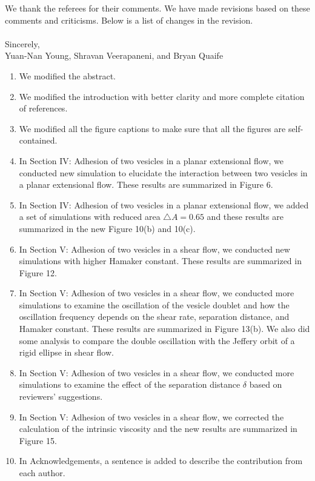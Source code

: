 \documentclass[11pt]{article}
\begin{document}
\noindent
We thank the referees for their comments.   We have made revisions based on these comments and criticisms.
Below is a list of changes in the revision.
\\ \\ \noindent 
Sincerely, \\ \noindent
Yuan-Nan Young, Shravan Veerapaneni, and Bryan Quaife

\vspace{20pt}

\begin{enumerate}

\item We modified the abstract.

\item We modified the introduction with better clarity and more complete citation of references.

\item We modified all the figure captions to make sure that all the figures are self-contained.

\item In Section IV: Adhesion of two vesicles in a planar extensional flow, we conducted new simulation to elucidate the interaction between two vesicles in a planar extensional flow. These results are summarized in Figure 6.

\item In Section IV: Adhesion of two vesicles in a planar extensional flow, we added a set of simulations with reduced area $\triangle A=0.65$ and these results are summarized in the new Figure 10(b) and 10(c).

\item In Section V: Adhesion of two vesicles in a shear flow, we conducted new  simulations with higher Hamaker constant. These results are summarized in Figure 12.

\item In Section V: Adhesion of two vesicles in a shear flow, we conducted more simulations to examine the oscillation of the vesicle doublet and how the oscillation frequency depends on 
the shear rate, separation distance, and Hamaker constant. These results are summarized in Figure 13(b). We also did some analysis to compare the double oscillation with the Jeffery orbit of a rigid ellipse in shear flow.

\item In Section V: Adhesion of two vesicles in a shear flow, we conducted more simulations to examine the effect of the separation distance $\delta$ based on reviewers' suggestions.

\item In Section V: Adhesion of two vesicles in a shear flow, we corrected the calculation of the intrinsic viscosity and the new results are summarized in Figure 15.

\item In Acknowledgements,  a sentence is added to describe the contribution from each author.


\end{enumerate}
\end{document}
